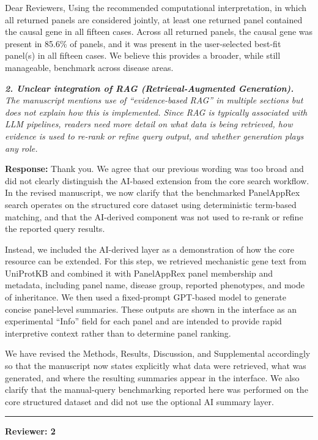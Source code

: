 \documentclass[12pt,a4paper]{letter}
\begin{document}
\begin{letter}{Dear Reviewers,}
Using the recommended computational interpretation, in which all returned panels are considered jointly, at least one returned panel contained the causal gene in all fifteen cases. Across all returned panels, the causal gene was present in 85.6\% of panels, and it was present in the user-selected best-fit panel(s) in all fifteen cases. We believe this provides a broader, while still manageable, benchmark across disease areas.

\textit{\textbf{2. Unclear integration of RAG (Retrieval-Augmented Generation).}\\
The manuscript mentions use of ``evidence-based RAG'' in multiple sections but does not explain how this is implemented. Since RAG is typically associated with LLM pipelines, readers need more detail on what data is being retrieved, how evidence is used to re-rank or refine query output, and whether generation plays any role.}

\textbf{Response:} Thank you. We agree that our previous wording was too broad and did not clearly distinguish the AI-based extension from the core search workflow. In the revised manuscript, we now clarify that the benchmarked PanelAppRex search operates on the structured core dataset using deterministic term-based matching, and that the AI-derived component was not used to re-rank or refine the reported query results.

Instead, we included the AI-derived layer as a demonstration of how the core resource can be extended. For this step, we retrieved mechanistic gene text from UniProtKB and combined it with PanelAppRex panel membership and metadata, including panel name, disease group, reported phenotypes, and mode of inheritance. We then used a fixed-prompt GPT-based model to generate concise panel-level summaries. These outputs are shown in the interface as an experimental ``Info'' field for each panel and are intended to provide rapid interpretive context rather than to determine panel ranking.

We have revised the Methods, Results, Discussion, and Supplemental accordingly so that the manuscript now states explicitly what data were retrieved, what was generated, and where the resulting summaries appear in the interface. We also clarify that the manual-query benchmarking reported here was performed on the core structured dataset and did not use the optional AI summary layer.

\noindent\rule{\textwidth}{0.4pt}
\clearpage

\textbf{Reviewer: 2}


\end{letter}
\end{document}
